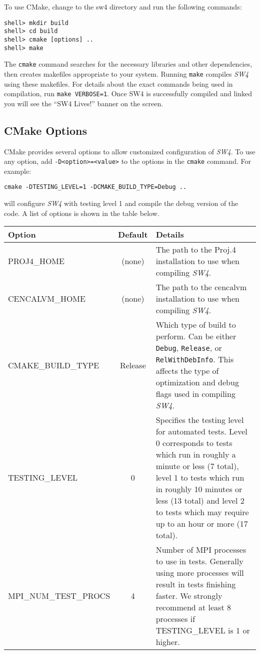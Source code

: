 \documentclass[11pt]{article}
\begin{document}
To use CMake, change to the sw4 directory and run the following commands:
\begin{verbatim}
shell> mkdir build
shell> cd build
shell> cmake [options] ..
shell> make
\end{verbatim}
The \verb+cmake+ command searches for the necessary libraries and other dependencies, then creates makefiles appropriate to your system.  Running \verb+make+ compiles \emph{SW4} using these makefiles.  For details about the exact commands being used in compilation, run \texttt{make VERBOSE=1}.  Once SW4 is successfully compiled and linked you will see the ``SW4 Lives!'' banner on the screen.

\subsection{CMake Options}
CMake provides several options to allow customized configuration of \emph{SW4}.  To use any option, add \texttt{-D\textless option\textgreater=\textless value\textgreater} to the options in the \texttt{cmake} command.  For example:

\begin{verbatim}
cmake -DTESTING_LEVEL=1 -DCMAKE_BUILD_TYPE=Debug ..
\end{verbatim}

will configure \emph{SW4} with testing level 1 and compile the debug version of the code.  A list of options is shown in the table below.

\begin{center}
\begin{tabular}{|l|c|p{}|}
\hline
Option & Default & Details \\
\hline
PROJ4\_HOME & (none) & The path to the Proj.4 installation to use when compiling \emph{SW4}. \\
\hline
CENCALVM\_HOME & (none) & The path to the cencalvm installation to use when compiling \emph{SW4}. \\
\hline
CMAKE\_BUILD\_TYPE & Release & Which type of build to perform.  Can be either \texttt{Debug}, \texttt{Release}, or \texttt{RelWithDebInfo}.  This affects the type of optimization and debug flags used in compiling \emph{SW4}. \\
\hline
TESTING\_LEVEL & 0 & Specifies the testing level for automated tests.  Level 0 corresponds to tests which run in roughly a minute or less (7 total), level 1 to tests which run in roughly 10 minutes or less (13 total) and level 2 to tests which may require up to an hour or more (17 total). \\
\hline
MPI\_NUM\_TEST\_PROCS & 4 & Number of MPI processes to use in tests. Generally using more processes will result in tests finishing faster.  We strongly recommend at least 8 processes if TESTING\_LEVEL is 1 or higher.\\
\hline
\end{tabular}
\end{center}
\end{document}
